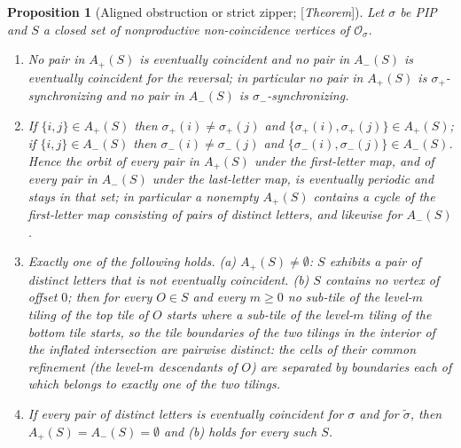 \documentclass[11pt]{amsart}
\theoremstyle{plain}
\newtheorem{proposition}[theorem]{Proposition}
\theoremstyle{definition}
\theoremstyle{remark}
\newcommand{\Status}[1]{\textup{[\textit{#1}]}}
\begin{document}
\begin{proposition}[Aligned obstruction or strict zipper; \Status{Theorem}]\label{prop:zipper-dichotomy}
Let $\sigma$ be PIP and $S$ a closed set of nonproductive non-coincidence vertices of $\mathcal O_\sigma$.
\begin{enumerate}[label=\textup{(\roman*)},leftmargin=*]
\item No pair in $A_+(S)$ is eventually coincident and no pair in $A_-(S)$ is eventually coincident for the reversal; in particular no pair in $A_+(S)$ is $\sigma_+$-synchronizing and no pair in $A_-(S)$ is $\sigma_-$-synchronizing.
\item If $\{i,j\}\in A_+(S)$ then $\sigma_+(i)\ne\sigma_+(j)$ and $\{\sigma_+(i),\sigma_+(j)\}\in A_+(S)$; if $\{i,j\}\in A_-(S)$ then $\sigma_-(i)\ne\sigma_-(j)$ and $\{\sigma_-(i),\sigma_-(j)\}\in A_-(S)$. Hence the orbit of every pair in $A_+(S)$ under the first-letter map, and of every pair in $A_-(S)$ under the last-letter map, is eventually periodic and stays in that set; in particular a nonempty $A_+(S)$ contains a cycle of the first-letter map consisting of pairs of distinct letters, and likewise for $A_-(S)$.
\item Exactly one of the following holds. \textup{(a)} $A_+(S)\ne\emptyset$: $S$ exhibits a pair of distinct letters that is not eventually coincident. \textup{(b)} $S$ contains no vertex of offset $0$; then for every $O\in S$ and every $m\ge0$ no sub-tile of the level-$m$ tiling of the top tile of $O$ starts where a sub-tile of the level-$m$ tiling of the bottom tile starts, so the tile boundaries of the two tilings in the interior of the inflated intersection are pairwise distinct: the cells of their common refinement (the level-$m$ descendants of $O$) are separated by boundaries each of which belongs to exactly one of the two tilings.
\item If every pair of distinct letters is eventually coincident for $\sigma$ and for $\tilde\sigma$, then $A_+(S)=A_-(S)=\emptyset$ and \textup{(b)} holds for every such $S$.
\end{enumerate}
\end{proposition}
\end{document}
